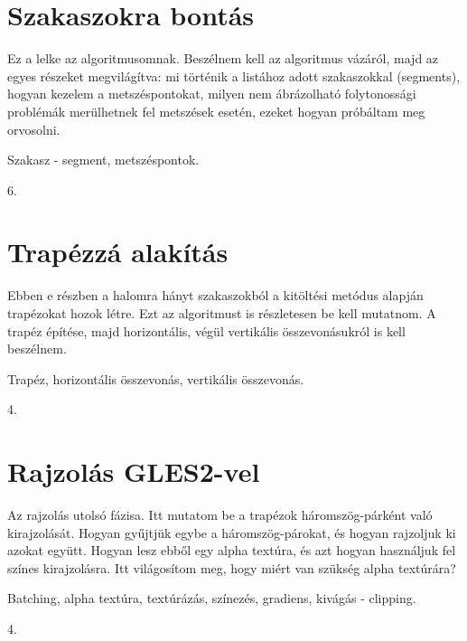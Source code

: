\documentclass[12pt]{report}
\theoremstyle{definition}
\begin{document}
  \section{Szakaszokra bontás}

Ez a lelke az algoritmusomnak. Beszélnem kell az algoritmus vázáról, majd
az egyes részeket megvilágítva: mi történik a listához adott
szakaszokkal (segments), hogyan kezelem a metszéspontokat, milyen nem
ábrázolható folytonossági problémák merülhetnek fel metszések
esetén, ezeket hogyan próbáltam meg orvosolni.

  \begin{description}[noitemsep]
    \item[Kulcsszavak] Szakasz - segment, metszéspontok.
    \item[Becsült oldalszám] 6.
  \end{description}

  \section{Trapézzá alakítás}

Ebben e részben a halomra hányt szakaszokból a kitöltési metódus
alapján trapézokat hozok létre. Ezt az algoritmust is részletesen be kell
mutatnom. A trapéz építése, majd horizontális, végül vertikális
összevonásukról is kell beszélnem.

  \begin{description}[noitemsep]
    \item[Kulcsszavak] Trapéz, horizontális összevonás, vertikális összevonás.
    \item[Becsült oldalszám] 4.
  \end{description}

  \section{Rajzolás GLES2-vel}

Az rajzolás utolsó fázisa. Itt mutatom be a trapézok
háromszög-párként való kirajzolását. Hogyan gyűjtjük egybe a
háromszög-párokat, és hogyan rajzoljuk ki azokat együtt. Hogyan lesz
ebből egy alpha textúra, és azt hogyan használjuk fel színes
kirajzolásra. Itt világosítom meg, hogy miért van szükség alpha textúrára?

  \begin{description}[noitemsep]
    \item[Kulcsszavak] Batching, alpha textúra, textúrázás, színezés,
    gradiens, kivágás - clipping.
    \item[Becsült oldalszám] 4.
  \end{description}
\end{document}
